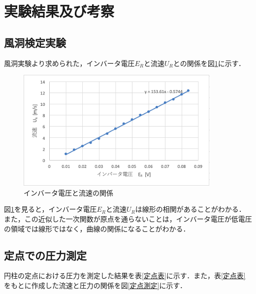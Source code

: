 \documentclass[a4paper,11pt,uplatex]{jsarticle}
\begin{document}
\section{実験結果及び考察}
\subsection{風洞検定実験}
風洞実験より求められた，インバータ電圧$E_R$と流速$U_R$との関係を図\ref{インバータ電圧と流速}に示す．

\begin{figure}[H]
  \begin{center}
    \includegraphics[width = 10cm]{pic/インバータと流速.png}
    \caption{インバータ電圧と流速の関係}
    \label{インバータ電圧と流速}
  \end{center}
\end{figure}

図\ref{インバータ電圧と流速}を見ると，インバータ電圧$E_R$と流速$U_R$は線形の相関があることがわかる．
また，この近似した一次関数が原点を通らないことは，インバータ電圧が低電圧の領域では線形ではなく，曲線の関係になることがわかる．

\subsection{定点での圧力測定}
円柱の定点における圧力を測定した結果を表\ref{定点表}に示す．また，表\ref{定点表}をもとに作成した流速と圧力の関係を図\ref{定点測定}に示す．
\end{document}
